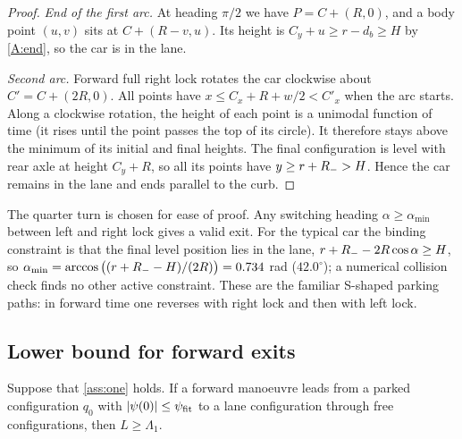 \begin{proof}
\emph{End of the first arc.}
At heading $\pi/2$ we have $P=C+(R,0)$, and a body point $(u,v)$ sits at $C+(R-v,u)$.
Its height is $C_y+u\ge r-d_b\ge H$ by \ref{A:end}, so the car is in the lane.

\emph{Second arc.}
Forward full right lock rotates the car clockwise about $C'=C+(2R,0)$.
All points have $x\le C_x+R+w/2<C'_x$ when the arc starts.
Along a clockwise rotation, the height of each point is a unimodal function of time (it rises until the point passes the top of its circle).
It therefore stays above the minimum of its initial and final heights.
The final configuration is level with rear axle at height $C_y+R$, so all its points have $y\ge r+R_{-}>H$.
Hence the car remains in the lane and ends parallel to the curb.
\end{proof}

\begin{remark}
The quarter turn is chosen for ease of proof.
Any switching heading $\alpha\ge\alpha_{\min}$ between left and right lock gives a valid exit.
For the typical car the binding constraint is that the final level position lies in the lane, $r+R_{-}-2R\cos\alpha\ge H$, so $\alpha_{\min}=\arccos\big((r+R_{-}-H)/(2R)\big)=0.734$ rad ($42.0^\circ$); a numerical collision check finds no other active constraint.
These are the familiar S-shaped parking paths: in forward time one reverses with right lock and then with left lock.
\end{remark}

\subsection{Lower bound for forward exits}

\begin{proposition}\label{prop:one-forward}
Suppose that \cref{ass:one} holds.
If a forward manoeuvre leads from a parked configuration $q_0$ with $|\psi(0)|\le\psi_{\rm fit}$ to a lane configuration through free configurations, then $L\ge\Lambda_1$.
\end{proposition}

